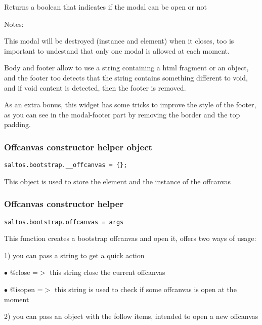 \documentclass[a4paper]{article}
\begin{document}
Returns a boolean that indicates if the modal can be open or not

Notes:

This modal will be destroyed (instance and element) when it closes, too is important
to undestand that only one modal is allowed at each moment.

Body and footer allow to use a string containing a html fragment or an object, and
the footer too detects that the string contains something different to void, and if
void content is detected, then the footer is removed.

As an extra bonus, this widget has some tricks to improve the style of the footer, as
you can see in the modal-footer part by removing the border and the top padding.

\hypertarget{toc664}{}
\subsubsection{Offcanvas constructor helper object}

\begin{lstlisting}
saltos.bootstrap.__offcanvas = {};
\end{lstlisting}

This object is used to store the element and the instance of the offcanvas

\hypertarget{toc665}{}
\subsubsection{Offcanvas constructor helper}

\begin{lstlisting}
saltos.bootstrap.offcanvas = args
\end{lstlisting}

This function creates a bootstrap offcanvas and open it, offers two ways of usage:

1) you can pass a string to get a quick action

\begin{compactitem}
\item[\color{myblue}$\bullet$] @close  =$>$ this string close the current offcanvas
\item[\color{myblue}$\bullet$] @isopen =$>$ this string is used to check if some offcanvas is open at the moment
\end{compactitem}

2) you can pass an object with the follow items, intended to open a new offcanvas
\end{document}
